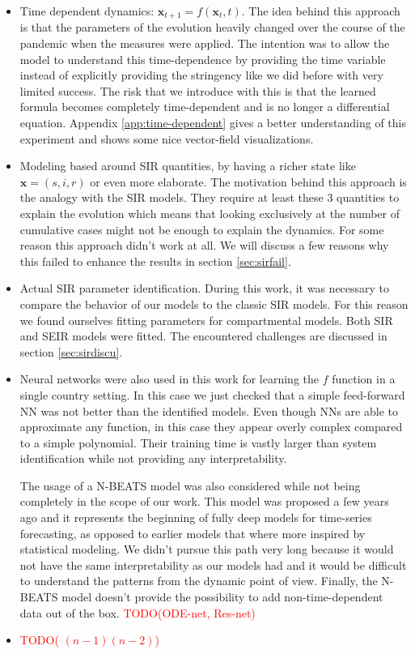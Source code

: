 \documentclass[12pt, letterpaper]{article}
\newcommand{\com}[1]{{\small {\fontfamily{ptm} \selectfont \textcolor{red}{#1}}}}
\begin{document}
\begin{itemize} 
	\item Time dependent dynamics: $\mathbf{x}_{t+1} = f(\mathbf{x}_t, t)$. 
	The idea behind this approach is that the parameters of the evolution heavily changed over the course of the pandemic when the measures were applied. 
	The intention was to allow the model to understand this time-dependence by providing the time variable instead of explicitly providing the stringency like we did before with very limited success. 
	The risk that we introduce with this is that the learned formula becomes completely time-dependent and is no longer a differential equation.
	Appendix \ref{app:time-dependent} gives a better understanding of this experiment and shows some nice vector-field visualizations.

	\item Modeling based around SIR quantities, by having a richer state like $\mathbf{x} = (s, i, r)$ or even more elaborate. 
	The motivation behind this approach is the analogy with the SIR models.
	They require at least these 3 quantities to explain the evolution which means that looking exclusively at the number of cumulative cases might not be enough to explain the dynamics. For some reason this approach didn't work at all. We will discuss a few reasons why this failed to enhance the results in section \ref{sec:sirfail}.

	\item Actual SIR parameter identification. During this work, it was necessary to compare the behavior of our models to the classic SIR models. 
	For this reason we found ourselves fitting parameters for compartmental models. Both SIR and SEIR models were fitted. The encountered challenges are discussed in section \ref{sec:sirdiscu}.

	\item Neural networks were also used in this work for learning the $f$ function in a single country setting. 
	In this case we just checked that a simple feed-forward NN was not better than the identified models. 
	Even though NNs are able to approximate any function, in this case they appear overly complex compared to a simple polynomial. 
	Their training time is vastly larger than system identification while not providing any interpretability.

	The usage of a N-BEATS \cite{n-beats} model was also considered while not being completely in the scope of our work. 
	This model was proposed a few years ago and it represents the beginning of fully deep models for time-series forecasting, as opposed to earlier models that where more inspired by statistical modeling. 
	We didn't pursue this path very long because it would not have the same interpretability as our models had and it would be difficult to understand the patterns from the dynamic point of view. Finally, the N-BEATS model doesn't provide the possibility to add non-time-dependent data out of the box.
	\com{TODO(ODE-net, Res-net)}

	\item \com{TODO( $(n-1)(n-2)$)}

\end{itemize}
\end{document}
